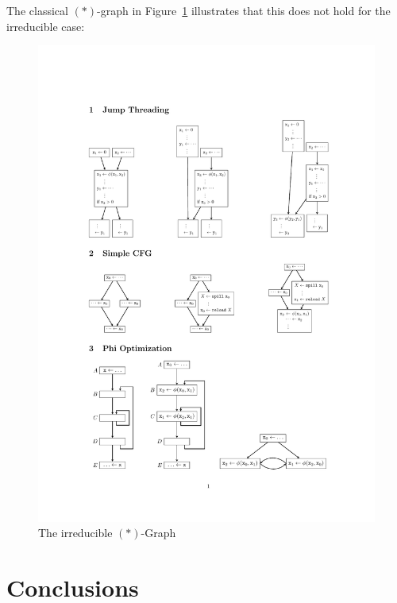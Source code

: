 The classical $(\ast)$-graph in Figure~\ref{fig:astgraph} illustrates that this does not hold for the irreducible case:
\begin{figure}[htbp]
	\begin{center}
		\includegraphics{ast_graph.pdf}
		\caption{The irreducible $(\ast)$-Graph}
		\label{fig:astgraph}
	\end{center}
\end{figure}


\section{Conclusions}

